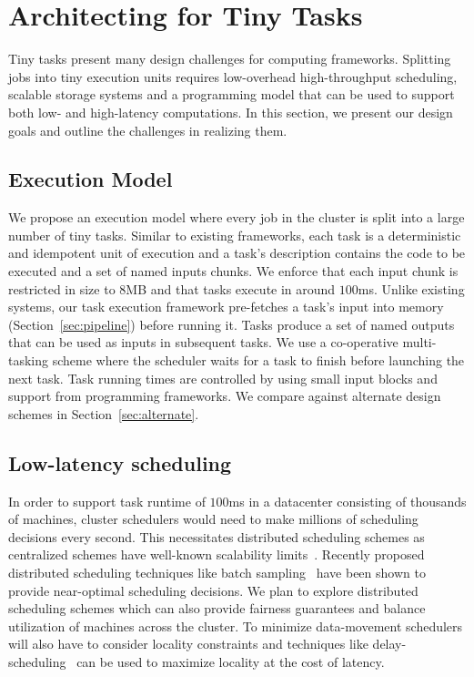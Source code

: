 \section{Architecting for Tiny Tasks}
Tiny tasks present many design challenges for computing frameworks.
Splitting jobs into tiny execution units requires low-overhead
high-throughput scheduling, scalable storage systems and a programming model
that can be used to support both low- and high-latency computations.
In this section, we present our design goals and outline the challenges in
realizing them.

\subsection{Execution Model}
We propose an execution model where every job in the cluster is split into a
large number of tiny tasks. Similar to existing frameworks, each task is a
deterministic and idempotent unit of execution and a task's description contains the code to be
executed and a set of named inputs chunks. We enforce that each input chunk is
restricted in size to 8MB and that tasks execute in around $100$ms.  Unlike
existing systems, our task execution framework pre-fetches a task's input into
memory (Section~\ref{sec:pipeline}) before running it. Tasks produce a set of named
outputs that can be used as inputs in subsequent tasks. We use a co-operative
multi-tasking scheme where the scheduler waits for a task to finish before launching
the next task.  Task running times are controlled by using small input blocks
and support from programming frameworks. We compare against alternate design
schemes in Section~\ref{sec:alternate}.

\subsection{Low-latency scheduling}
In order to support task runtime of $100$ms in a datacenter consisting of thousands
of machines, cluster schedulers would need to make millions of scheduling decisions
every second. This necessitates distributed scheduling schemes as centralized schemes
have well-known scalability limits~\cite{john-wilkes-berkeley}.
Recently proposed distributed
scheduling techniques like batch sampling~\cite{sparrow} have been shown to
provide near-optimal scheduling decisions. We plan to explore distributed
scheduling schemes which can also provide fairness guarantees and balance
utilization of machines across the cluster. To minimize data-movement
schedulers will also have to consider locality constraints
and techniques like delay-scheduling~\cite{delay} can be used to maximize locality at the
cost of latency.

